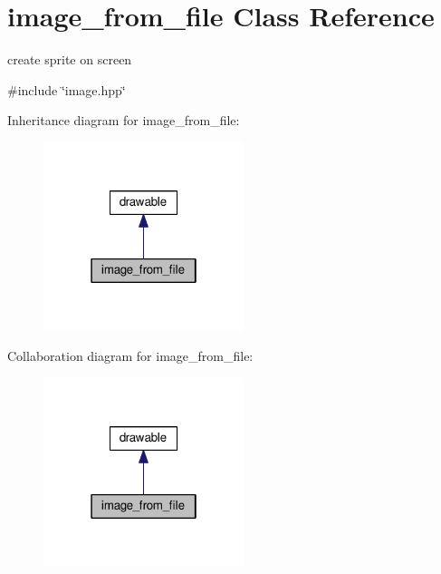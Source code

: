 \hypertarget{classimage__from__file}{}\section{image\+\_\+from\+\_\+file Class Reference}
\label{classimage__from__file}


create sprite on screen  




{\ttfamily \#include \char`\"{}image.\+hpp\char`\"{}}



Inheritance diagram for image\+\_\+from\+\_\+file\+:\nopagebreak
\begin{figure}[H]
\begin{center}
\leavevmode
\includegraphics[width=166pt]{classimage__from__file__inherit__graph}
\end{center}
\end{figure}


Collaboration diagram for image\+\_\+from\+\_\+file\+:\nopagebreak
\begin{figure}[H]
\begin{center}
\leavevmode
\includegraphics[width=166pt]{classimage__from__file__coll__graph}
\end{center}
\end{figure}
